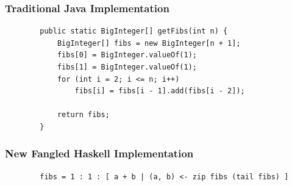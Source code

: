 \documentclass{beamer}
\begin{document}
    \lstset{language=Java}
    \begin{frame}[fragile=singleslide]
        \frametitle{Traditional Java Implementation}
        
        \begin{lstlisting}
        public static BigInteger[] getFibs(int n) {
            BigInteger[] fibs = new BigInteger[n + 1];
            fibs[0] = BigInteger.valueOf(1);
            fibs[1] = BigInteger.valueOf(1);
            for (int i = 2; i <= n; i++)
                fibs[i] = fibs[i - 1].add(fibs[i - 2]);

            return fibs;
        }
        \end{lstlisting}
    \end{frame}

    \lstset{language=Haskell}
    \begin{frame}[fragile=singleslide]
        \frametitle{New Fangled Haskell Implementation}

        \begin{lstlisting}
        fibs = 1 : 1 : [ a + b | (a, b) <- zip fibs (tail fibs) ]
        \end{lstlisting}
    \end{frame}
\end{document}
